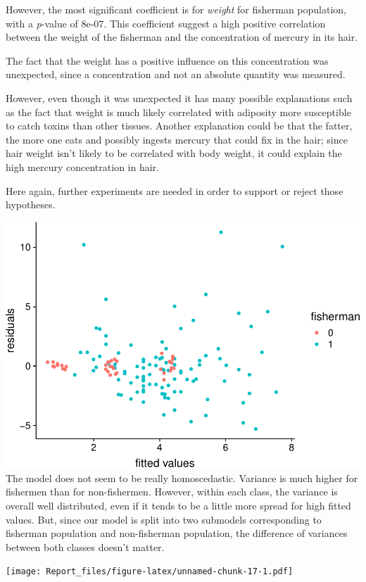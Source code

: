 \documentclass[12pt,]{article}
\begin{document}
However, the most significant coefficient is for \emph{weight} for
fisherman population, with a \emph{p}-value of 8e-07. This coefficient
suggest a high positive correlation between the weight of the fisherman
and the concentration of mercury in its hair.

The fact that the weight has a positive influence on this concentration
was unexpected, since a concentration and not an absolute quantity was
measured.

However, even though it was unexpected it has many possible explanations
such as the fact that weight is much likely correlated with adiposity
more susceptible to catch toxins than other tissues. Another explanation
could be that the fatter, the more one eats and possibly ingests mercury
that could fix in the hair; since hair weight isn't likely to be
correlated with body weight, it could explain the high mercury
concentration in hair.

Here again, further experiments are needed in order to support or reject
those hypotheses.

\includegraphics{Report_files/figure-latex/unnamed-chunk-16-1.pdf} The
model does not seem to be really homoscedastic. Variance is much higher
for fishermen than for non-fishermen. However, within each class, the
variance is overall well distributed, even if it tends to be a little
more spread for high fitted values. But, since our model is split into
two submodels corresponding to fisherman population and non-fisherman
population, the difference of variances between both classes doesn't
matter.

\texttt{[image: Report\_files/figure-latex/unnamed-chunk-17-1.pdf]}
\end{document}

